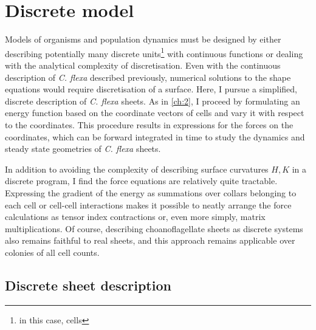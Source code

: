 \chapter{Discrete model} \label{ch:3}

\ifpdf
    \graphicspath{{Chapter3/Figs/Raster/}{Chapter3/Figs/PDF/}{Chapter3/Figs/}}
\else
    \graphicspath{{Chapter3/Figs/Vector/}{Chapter3/Figs/}}
\fi

Models of organisms and population dynamics must be designed by either describing potentially many discrete units\footnote{in this case, cells} with continuous functions or dealing with the analytical complexity of discretisation. 
Even with the continuous description of \textit{C. flexa} described previously, numerical solutions to the shape equations would require discretisation of a surface. 
Here, I pursue a simplified, discrete description of \textit{C. flexa} sheets. 
As in \cref{ch:2}, I proceed by formulating an energy function based on the coordinate vectors of cells and vary it with respect to the coordinates. 
This procedure results in expressions for the forces on the coordinates, which can be forward integrated in time to study the dynamics and steady state geometries of \textit{C. flexa} sheets.

In addition to avoiding the complexity of describing surface curvatures $H, K$ in a discrete program, I find the force equations are relatively quite tractable. 
Expressing the gradient of the energy as summations over collars belonging to each cell or cell-cell interactions makes it possible to neatly arrange the force calculations as tensor index contractions or, even more simply, matrix multiplications. 
Of course, describing choanoflagellate sheets as discrete systems also remains faithful to real sheets, and this approach remains applicable over colonies of all cell counts. 

\section{Discrete sheet description} \label{sec:description}

